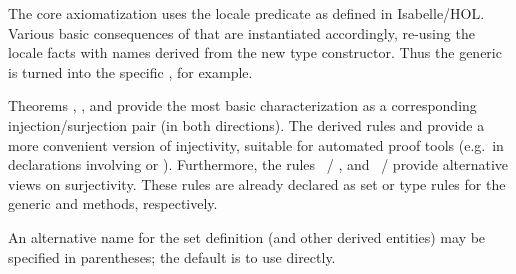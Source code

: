 \begin{isabellebody}
\begin{isamarkuptext}
\begin{description}
  The core axiomatization uses the locale predicate  as defined in Isabelle/HOL.  Various basic
  consequences of that are instantiated accordingly, re-using the
  locale facts with names derived from the new type constructor.  Thus
  the generic  is turned into the specific
  , for example.

  Theorems , , and 
  provide the most basic characterization as a corresponding
  injection/surjection pair (in both directions).  The derived rules
   and  provide a more convenient version of
  injectivity, suitable for automated proof tools (e.g.\ in
  declarations involving \hyperlink{attribute.simp}{\mbox{}} or \hyperlink{attribute.iff}{\mbox{}}).
  Furthermore, the rules ~/ , and ~/
   provide alternative views on
  surjectivity.  These rules are already declared as set or type rules
  for the generic \hyperlink{method.cases}{\mbox{}} and \hyperlink{method.induct}{\mbox{}} methods,
  respectively.

  An alternative name for the set definition (and other derived
  entities) may be specified in parentheses; the default is to use
   directly.


\end{description}
\end{isamarkuptext}
\end{isabellebody}
